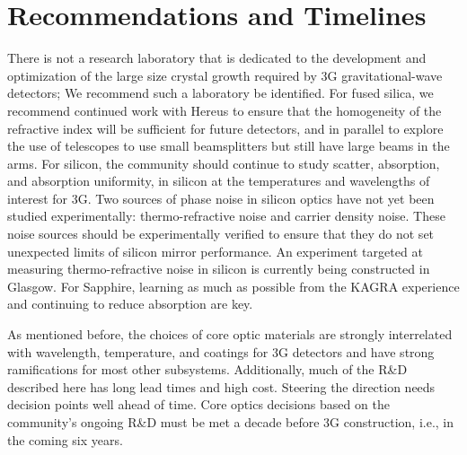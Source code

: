 

\section{Recommendations and Timelines} 

There is not a research laboratory that is dedicated to the development and optimization of the large size crystal growth required by 3G gravitational-wave detectors; We recommend such a laboratory be identified. 
For fused silica, we recommend continued work with Hereus to ensure that the homogeneity of the refractive index will be sufficient for future detectors, and in parallel to explore the use of telescopes to use small beamsplitters but still have large beams in the arms. For silicon, the community should continue to study scatter, absorption, and absorption uniformity, in silicon at the temperatures and wavelengths of interest for 3G. Two sources of phase noise in silicon optics have not yet been studied experimentally: thermo-refractive noise and carrier density noise. These noise sources should be experimentally verified to ensure that they do not set unexpected limits of silicon mirror performance. An experiment targeted at measuring thermo-refractive noise in silicon is currently being constructed in Glasgow. For Sapphire, learning as much as possible from the KAGRA experience and continuing to reduce absorption are key. 

As mentioned before, the choices of core optic materials are strongly interrelated with wavelength, temperature, and coatings for 3G detectors and have strong ramifications for most other subsystems. Additionally, much of the R\&D described here has long lead times and high cost. Steering the direction needs decision points well ahead of time. Core optics decisions based on the community's ongoing R\&D must be met a decade before 3G construction, i.e., in the coming six years. 

